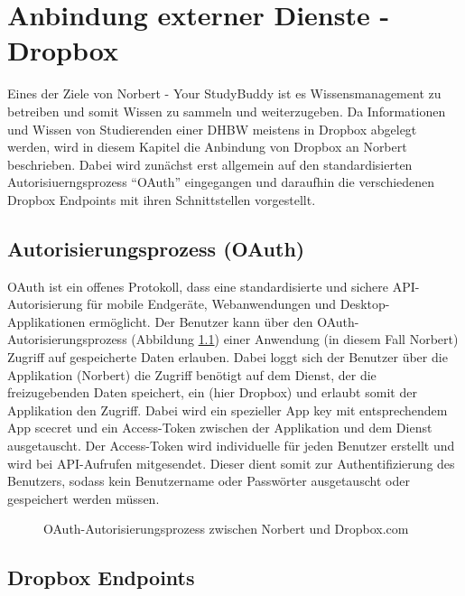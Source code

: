 

\chapter{Anbindung externer Dienste - Dropbox}

Eines der Ziele von Norbert - Your StudyBuddy ist es Wissensmanagement zu betreiben und somit Wissen zu sammeln und weiterzugeben. Da Informationen und Wissen von Studierenden einer DHBW meistens in Dropbox abgelegt werden, wird in diesem Kapitel die Anbindung von Dropbox an Norbert beschrieben. Dabei wird zunächst erst allgemein auf den standardisierten Autorisiuerngsprozess \enquote{OAuth} eingegangen und daraufhin die verschiedenen Dropbox Endpoints mit ihren Schnittstellen vorgestellt.


\section{Autorisierungsprozess (OAuth)}

OAuth ist ein offenes Protokoll, dass eine standardisierte und sichere API-Autorisierung für mobile Endgeräte, Webanwendungen und Desktop-Applikationen ermöglicht. Der Benutzer kann über den OAuth-Autorisierungsprozess (Abbildung \ref{04ergebnis:oauth}) einer Anwendung (in diesem Fall Norbert) Zugriff auf gespeicherte Daten erlauben. Dabei loggt sich der Benutzer über die Applikation (Norbert) die Zugriff benötigt auf dem Dienst, der die freizugebenden Daten speichert, ein (hier Dropbox) und erlaubt somit der Applikation den Zugriff. Dabei wird ein spezieller App key mit entsprechendem App scecret und ein Access-Token zwischen der Applikation und dem Dienst ausgetauscht. Der Access-Token wird individuelle für jeden Benutzer erstellt und wird bei API-Aufrufen mitgesendet. Dieser dient somit zur Authentifizierung des Benutzers, sodass kein Benutzername oder Passwörter ausgetauscht oder gespeichert werden müssen.

\begin{figure}[H]
\centering
	\scalebox{0.5}{}
	\caption{OAuth-Autorisierungsprozess zwischen Norbert und Dropbox.com}
	\label{04ergebnis:oauth}	
\end{figure}


\section{Dropbox Endpoints}

